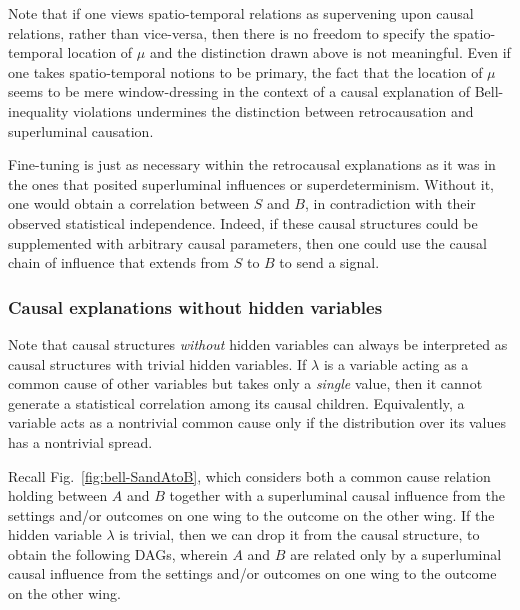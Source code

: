 \documentclass[12pt,onecolumn,nofootinbib]{revtex4-2}
\begin{document}
Note that if one views spatio-temporal relations as supervening upon causal relations, rather than vice-versa, then there is no freedom to specify the spatio-temporal location of $\mu$ and the distinction drawn above is not meaningful. Even if one takes spatio-temporal notions to be primary, the fact that the location of $\mu$ seems to be mere window-dressing in the context of a causal explanation of Bell-inequality violations undermines the distinction between retrocausation and superluminal causation.

Fine-tuning is just as necessary within the retrocausal explanations as it was in the ones that posited superluminal influences or superdeterminism.  Without it, one would obtain a correlation between $S$ and $B$, in contradiction with their observed statistical independence. Indeed, if these causal structures could be supplemented with arbitrary causal parameters, then one could use the causal chain of influence that extends from $S$ to $B$ to send a signal.


\subsubsection{Causal explanations without hidden variables}

Note that causal structures \emph{without} hidden variables can always be interpreted as causal structures with trivial hidden variables.  
If $\lambda$ is a variable acting as a common cause of other variables but takes only a \emph{single} value, then it cannot generate a statistical correlation among its causal children.  Equivalently, a variable acts as a nontrivial common cause only if the distribution over its values has a nontrivial spread.

Recall Fig.~\ref{fig:bell-SandAtoB}, which considers both a common cause relation holding between $A$ and $B$ together with a superluminal causal influence from the settings and/or outcomes on one wing to the outcome on the other wing.  If the hidden variable $\lambda$ is trivial, then we can drop it from the causal structure, to obtain the following DAGs, wherein $A$ and $B$ are related only by a superluminal causal influence from the settings and/or outcomes on one wing to the outcome on the other wing. 
\end{document}
